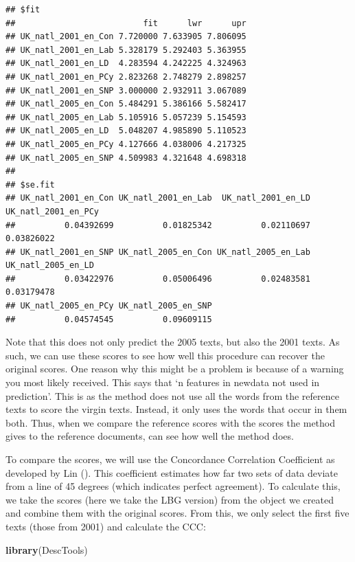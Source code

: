 \documentclass[
]{book}
\newenvironment{Shaded}{\begin{snugshade}}{\end{snugshade}}
\newcommand{\FunctionTok}[1]{\textcolor[rgb]{0.13,0.29,0.53}{\textbf{#1}}}
\newcommand{\NormalTok}[1]{#1}
\begin{document}
\begin{verbatim}
## $fit
##                          fit      lwr      upr
## UK_natl_2001_en_Con 7.720000 7.633905 7.806095
## UK_natl_2001_en_Lab 5.328179 5.292403 5.363955
## UK_natl_2001_en_LD  4.283594 4.242225 4.324963
## UK_natl_2001_en_PCy 2.823268 2.748279 2.898257
## UK_natl_2001_en_SNP 3.000000 2.932911 3.067089
## UK_natl_2005_en_Con 5.484291 5.386166 5.582417
## UK_natl_2005_en_Lab 5.105916 5.057239 5.154593
## UK_natl_2005_en_LD  5.048207 4.985890 5.110523
## UK_natl_2005_en_PCy 4.127666 4.038006 4.217325
## UK_natl_2005_en_SNP 4.509983 4.321648 4.698318
## 
## $se.fit
## UK_natl_2001_en_Con UK_natl_2001_en_Lab  UK_natl_2001_en_LD UK_natl_2001_en_PCy 
##          0.04392699          0.01825342          0.02110697          0.03826022 
## UK_natl_2001_en_SNP UK_natl_2005_en_Con UK_natl_2005_en_Lab  UK_natl_2005_en_LD 
##          0.03422976          0.05006496          0.02483581          0.03179478 
## UK_natl_2005_en_PCy UK_natl_2005_en_SNP 
##          0.04574545          0.09609115
\end{verbatim}

Note that this does not only predict the 2005 texts, but also the 2001 texts. As such, we can use these scores to see how well this procedure can recover the original scores. One reason why this might be a problem is because of a warning you most likely received. This says that `n features in newdata not used in prediction'. This is as the method does not use all the words from the reference texts to score the virgin texts. Instead, it only uses the words that occur in them both. Thus, when we compare the reference scores with the scores the method gives to the reference documents, can see how well the method does.

To compare the scores, we will use the Concordance Correlation Coefficient as developed by Lin (). This coefficient estimates how far two sets of data deviate from a line of 45 degrees (which indicates perfect agreement). To calculate this, we take the scores (here we take the LBG version) from the object we created and combine them with the original scores. From this, we only select the first five texts (those from 2001) and calculate the CCC:

\begin{Shaded}
\begin{Highlighting}[]
\FunctionTok{library}\NormalTok{(DescTools)}
\end{Highlighting}
\end{Shaded}
\end{document}
